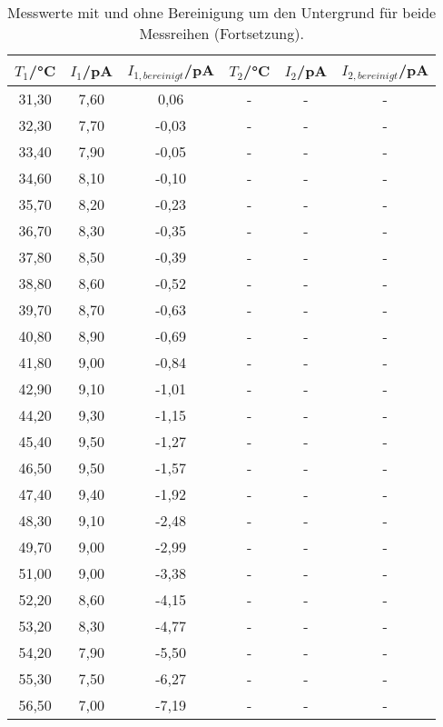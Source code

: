 \begin{table}[htp]
	\begin{center}
    \caption{Messwerte mit und ohne Bereinigung um den Untergrund für beide Messreihen (Fortsetzung).}
    \label{tab:messwerte3}
		\begin{tabular}{cccccc}
		\toprule
			{$T_1$/°C} & {$I_1$/pA} & {$I_{1,bereinigt}$/pA} & {$T_2$/°C} & {$I_2$/pA} & {$I_{2,bereinigt}$/pA}\\
			\midrule
			31,30 & 7,60 & 0,06 & - & - & -\\
			32,30 & 7,70 & -0,03 & - & - & -\\
			33,40 & 7,90 & -0,05 & - & - & -\\
			34,60 & 8,10 & -0,10 & - & - & -\\
			35,70 & 8,20 & -0,23 & - & - & -\\
			36,70 & 8,30 & -0,35 & - & - & -\\
			37,80 & 8,50 & -0,39 & - & - & -\\
			38,80 & 8,60 & -0,52 & - & - & -\\
			39,70 & 8,70 & -0,63 & - & - & -\\
			40,80 & 8,90 & -0,69 & - & - & -\\
			41,80 & 9,00 & -0,84 & - & - & -\\
			42,90 & 9,10 & -1,01 & - & - & -\\
			44,20 & 9,30 & -1,15 & - & - & -\\
			45,40 & 9,50 & -1,27 & - & - & -\\
			46,50 & 9,50 & -1,57 & - & - & -\\
			47,40 & 9,40 & -1,92 & - & - & -\\
			48,30 & 9,10 & -2,48 & - & - & -\\
			49,70 & 9,00 & -2,99 & - & - & -\\
			51,00 & 9,00 & -3,38 & - & - & -\\
			52,20 & 8,60 & -4,15 & - & - & -\\
			53,20 & 8,30 & -4,77 & - & - & -\\
			54,20 & 7,90 & -5,50 & - & - & -\\
			55,30 & 7,50 & -6,27 & - & - & -\\
			56,50 & 7,00 & -7,19 & - & - & -\\
		\bottomrule
		\end{tabular}
	\end{center}
\end{table}

